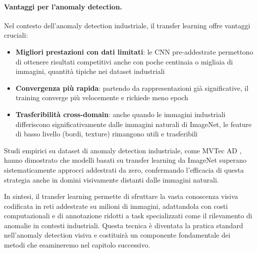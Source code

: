 \paragraph{Vantaggi per l'anomaly detection.} Nel contesto dell'anomaly detection industriale, il transfer learning offre vantaggi cruciali:

\begin{itemize}
\item \textbf{Migliori prestazioni con dati limitati}: le CNN pre-addestrate permettono di ottenere risultati competitivi anche con poche centinaia o migliaia di immagini, quantità tipiche nei dataset industriali

\item \textbf{Convergenza più rapida}: partendo da rappresentazioni già significative, il training converge più velocemente e richiede meno epoch

\item \textbf{Trasferibilità cross-domain}: anche quando le immagini industriali differiscono significativamente dalle immagini naturali di ImageNet, le feature di basso livello (bordi, texture) rimangono utili e trasferibili
\end{itemize}

Studi empirici su dataset di anomaly detection industriale, come MVTec AD \cite{bergmann2019mvtec}, hanno dimostrato che modelli basati su transfer learning da ImageNet superano sistematicamente approcci addestrati da zero, confermando l'efficacia di questa strategia anche in domini visivamente distanti dalle immagini naturali.

In sintesi, il transfer learning permette di sfruttare la vasta conoscenza visiva codificata in reti addestrate su milioni di immagini, adattandola con costi computazionali e di annotazione ridotti a task specializzati come il rilevamento di anomalie in contesti industriali. Questa tecnica è diventata la pratica standard nell'anomaly detection visiva e costituirà un componente fondamentale dei metodi che esamineremo nel capitolo successivo.


